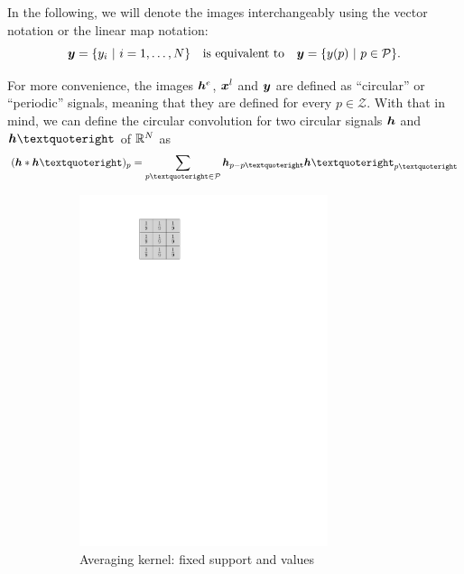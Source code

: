 In the following, we will denote the images interchangeably using the vector notation  or the linear map notation: $$\bm{y} = \{ y_i ~|~ i=1,\dots,N \} \quad \text{is equivalent to}\quad \bm{y} = \{y(p) ~|~ p \in \mathcal P\}.$$

For more convenience, the images $\bm{h}^e$, $\bm{x}^l$ and $\bm{y}$ are defined as “circular” or “periodic” signals, meaning that they are defined for every $p \in \mathcal{Z}$. With that in mind, we can define the circular convolution for two circular signals $\bm{h}$ and $\h’$ of $\mathbb{R}^N$ as
$$(\h * \h’)_p = \sum_{p’ \in \P} \h_{p-p’} \h’_{p’}$$

\begin{figure}[!ht]\centering
\begin{subfigure}[b]{0.20\textwidth}\centering
\includegraphics[width=0.80\textwidth]{figures/kernel-exple.pdf}
\caption{Averaging kernel: fixed support and values}
\end{subfigure}
\begin{subfigure}[b]{0.79\textwidth}\centering

\end{subfigure}
\end{figure}
